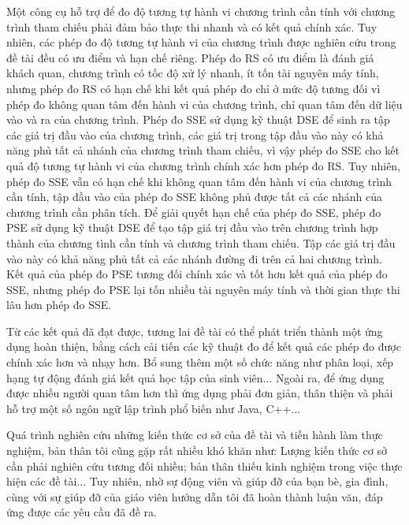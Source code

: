 Một công cụ hỗ trợ để đo độ tương tự hành vi chương trình cần tính
với chương trình tham chiếu phải đảm bảo thực thi nhanh và có kết quả 
chính xác. Tuy nhiên, các phép đo độ tương tự hành vi của chương trình 
được nghiên cứu trong đề tài đều có ưu điểm và hạn chế riêng. Phép đo RS có 
ưu điểm là đánh giá khách quan, chương trình có tốc độ xử lý nhanh, ít tốn 
tài nguyên máy tính, nhưng phép đo RS có hạn chế khi kết quả phép đo 
chỉ ở mức độ tương đối vì phép đo không quan tâm đến hành vi 
của chương trình, chỉ quan tâm đến dữ liệu vào và ra của chương trình.
Phép đo SSE sử dụng kỹ thuật DSE để sinh ra tập các giá trị đầu vào của 
chương trình, các giá trị trong tập đầu vào này có khả năng phủ tất cả 
nhánh của chương trình tham chiếu, vì vậy phép đo SSE cho kết quả độ tương 
tự hành vi của chương trình chính xác hơn phép đo RS. Tuy nhiên, phép đo 
SSE vẫn có hạn chế khi không quan tâm đến hành vi của chương trình cần 
tính, tập đầu vào của phép đo SSE không phủ được tất cả các nhánh của 
chương trình cần phân tích. Để giải quyết hạn chế của phép đo SSE, phép đo 
PSE sử dụng kỹ thuật DSE để tạo tập giá trị đầu vào trên chương trình hợp 
thành của chương tình cần tính và chương trình tham chiếu. Tập các giá trị 
đầu vào này có khả năng phủ tất cả các nhánh đường đi trên cả hai chương 
trình. Kết quả của phép đo PSE tương đối chính xác và tốt hơn kết quả của 
phép đo SSE, nhưng phép đo PSE lại tốn nhiều tài nguyên máy tính và thời 
gian thực thi lâu hơn phép đo SSE.

Từ các kết quả đã đạt được, tương lai đề tài có thể phát triển thành 
một ứng dụng hoàn thiện, bằng cách cải tiến các kỹ thuật đo để kết quả 
các phép đo được chính xác hơn và nhạy hơn. Bổ sung thêm một số chức năng 
như phân loại, xếp hạng tự động đánh giá kết quả học tập của sinh viên... 
Ngoài ra, để ứng dụng được nhiều người quan tâm hơn thì ứng dụng phải 
đơn giản, thân thiện và phải hỗ trợ một số ngôn ngữ lập trình phổ biến như Java, C++... 

Quá trình nghiên cứu những kiến thức cơ sở của đề tài và tiến hành làm 
thực nghiệm, bản thân tôi cũng gặp rất nhiều khó khăn như: Lượng kiến thức 
cơ sở cần phải nghiên cứu tương đối nhiều; bản thân thiếu kinh nghiệm trong 
việc thực hiện các đề tài... Tuy nhiên, nhờ sự động viên và giúp đỡ của bạn 
bè, gia đình, cùng với sự giúp đỡ của giáo viên hướng dẫn tôi đã hoàn 
thành luận văn, đáp ứng được các yêu cầu đã đề ra.


